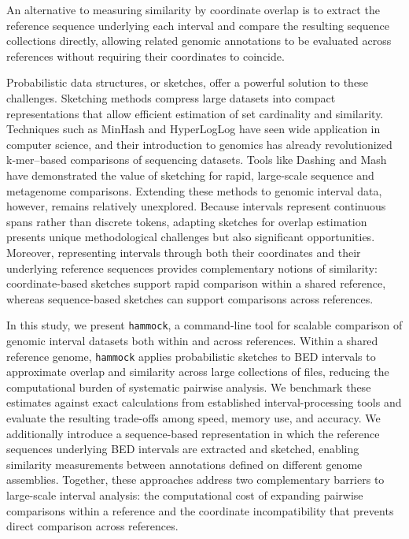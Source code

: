 \documentclass[11pt]{article}
\newcommand{\program}[1]{\texttt{#1}}
\begin{document}
An alternative to measuring similarity by coordinate overlap is to extract the reference sequence underlying each interval and compare the resulting sequence collections directly, allowing related genomic annotations to be evaluated across references without requiring their coordinates to coincide.


Probabilistic data structures, or sketches, offer a powerful solution to these challenges. Sketching methods compress large datasets into compact representations that allow efficient estimation of set cardinality and similarity. Techniques such as MinHash\cite{minhash} and HyperLogLog\cite{hll} have seen wide application in computer science, and their introduction to genomics has already revolutionized k-mer--based comparisons of sequencing datasets. Tools like Dashing \cite{dashing} and Mash\cite{mash} have demonstrated the value of sketching for rapid, large-scale sequence and metagenome comparisons. Extending these methods to genomic interval data, however, remains relatively unexplored. Because intervals represent continuous spans rather than discrete tokens, adapting sketches for overlap estimation presents unique methodological challenges but also significant opportunities. Moreover, representing intervals through both their coordinates and their underlying reference sequences provides complementary notions of similarity: coordinate-based sketches support rapid comparison within a shared reference, whereas sequence-based sketches can support comparisons across references.

In this study, we present \program{hammock}, a command-line tool for scalable comparison of genomic interval datasets both within and across references. Within a shared reference genome, \program{hammock} applies probabilistic sketches to BED intervals to approximate overlap and similarity across large collections of files, reducing the computational burden of systematic pairwise analysis. We benchmark these estimates against exact calculations from established interval-processing tools and evaluate the resulting trade-offs among speed, memory use, and accuracy. We additionally introduce a sequence-based representation in which the reference sequences underlying BED intervals are extracted and sketched, enabling similarity measurements between annotations defined on different genome assemblies. Together, these approaches address two complementary barriers to large-scale interval analysis: the computational cost of expanding pairwise comparisons within a reference and the coordinate incompatibility that prevents direct comparison across references.
\end{document}
